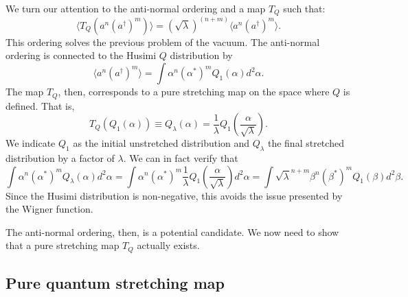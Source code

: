 \documentclass{article}
\begin{document}
We turn our attention to the anti-normal ordering and a map $T_Q$ such that:
\begin{equation}
\langle T_Q(a^n(a^\dagger)^m) \rangle = (\sqrt{\lambda})^{(n+m)} \langle a^n(a^\dagger)^m \rangle.
\end{equation}
This ordering solves the previous problem of the vacuum. The anti-normal ordering is connected to the Husimi $Q$ distribution by
\begin{equation}
    \langle a^n (a^\dagger)^m\rangle=\int \alpha^n(\alpha^*)^m Q_1(\alpha)d^2\alpha.
\end{equation}
The map $T_Q$, then, corresponds to a pure stretching map on the space where $Q$ is defined. That is,
\begin{equation}
T_Q(Q_1(\alpha)) \equiv Q_\lambda(\alpha) = \frac{1}{\lambda}Q_1\left(\frac{\alpha}{\sqrt{\lambda}}\right).
\end{equation}
We indicate $Q_1$ as the initial unstretched distribution and $Q_\lambda$ the final stretched distribution by a factor of $\lambda$. We can in fact verify that 
\begin{equation}
\int \alpha^n(\alpha^*)^m Q_\lambda(\alpha)d^2\alpha=\int \alpha^n(\alpha^*)^m \frac{1}{\lambda}Q_1\left(\frac{\alpha}{\sqrt{\lambda}}\right)d^2\alpha=\int \sqrt{\lambda}^{n+m}\beta^n(\beta^*)^m Q_1(\beta)d^2\beta.
\end{equation}
Since the Husimi distribution is non-negative, this avoids the issue presented by the Wigner function.

The anti-normal ordering, then, is a potential candidate. We now need to show that a pure stretching map $T_Q$ actually exists.

\subsection{Pure quantum stretching map}
\end{document}
